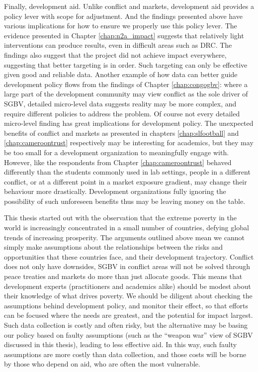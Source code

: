 Finally, development aid. Unlike conflict and markets, development aid provides a policy lever with scope for adjustment. And the findings presented above have various implications for how to ensure we properly use this policy lever. The evidence presented in Chapter \ref{chap:n2a_impact} suggests that relatively light interventions can produce results, even in difficult areas such as DRC. The findings also suggest that the project did not achieve impact everywhere, suggesting that better targeting is in order. Such targeting can only be effective given good and reliable data. Another example of how data can better guide development policy flows from the findings of Chapter \ref{chap:congogbv}: where a large part of the development community may view conflict as the sole driver of SGBV, detailed micro-level data suggests reality may be more complex, and require different policies to address the problem. Of course not every detailed micro-level finding has great implications for development policy. The unexpected benefits of conflict and markets as presented in chapters \ref{chap:slfootball} and \ref{chap:cameroontrust} respectively may be interesting for academics, but they may be too small for a development organization to meaningfully engage with. However, like the respondents from Chapter \ref{chap:cameroontrust} behaved differently than the students commonly used in lab settings, people in a different conflict, or at a different point in a market exposure gradient, may change their behaviour more drastically. Development organizations fully ignoring the possibility of such unforeseen benefits thus may be leaving money on the table.

This thesis started out with the observation that the extreme poverty in the world is increasingly concentrated in a small number of countries, defying global trends of increasing prosperity. The arguments outlined above mean we cannot simply make assumptions about the relationships between the risks and opportunities that these countries face, and their development trajectory. Conflict does not only have downsides, SGBV in conflict areas will not be solved through peace treaties and markets do more than just allocate goods. This means that development experts (practitioners and academics alike) should be modest about their knowledge of what drives poverty. We should be diligent about checking the assumptions behind development policy, and monitor their effect, so that efforts can be focused where the needs are greatest, and the potential for impact largest. Such data collection is costly and often risky, but the alternative may be basing our policy based on faulty assumptions (such as the ``weapon war'' view of SGBV discussed in this thesis), leading to less effective aid. In this way, such faulty assumptions are more costly than data collection, and those costs will be borne by those who depend on aid, who are often the most vulnerable. 



%
